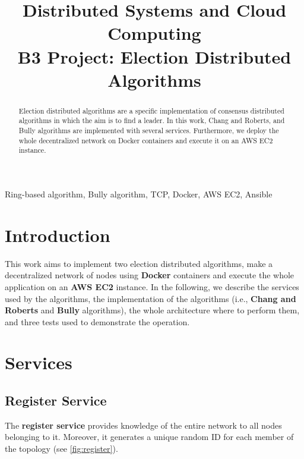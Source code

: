 \documentclass[conference]{IEEEtran}
\begin{document}
\title{Distributed Systems and Cloud Computing \\ 
B3 Project: Election Distributed Algorithms}

\author{
}

\maketitle

\begin{abstract}
Election distributed algorithms are a specific implementation of consensus distributed algorithms in which the aim is to find a leader. In this work, Chang and Roberts, and Bully algorithms are implemented with several services. Furthermore, we deploy the whole decentralized network on Docker containers and execute it on an AWS EC2 instance.
\end{abstract}

\begin{IEEEkeywords}
Ring-based algorithm, Bully algorithm, TCP, Docker, AWS EC2, Ansible
\end{IEEEkeywords}

\section{Introduction}
This work aims to implement two election distributed algorithms, make a decentralized network of nodes using \textbf{Docker} containers and execute the whole application on an \textbf{AWS EC2} instance. 
In the following, we describe the services used by the algorithms, the implementation of the algorithms (i.e., \textbf{Chang and Roberts} and \textbf{Bully} algorithms), the whole architecture where to perform them, and three tests used to demonstrate the operation.

\section{Services}

\subsection{Register Service}\label{register}

The \textbf{register service} provides knowledge of the entire network to all nodes belonging to it. Moreover, it generates a unique random ID for each member of the topology (see \ref{fig:register}). 
\end{document}
